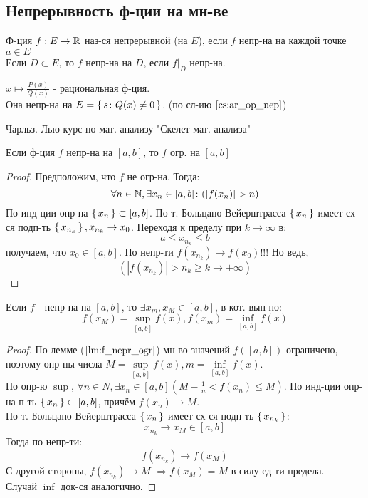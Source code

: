 \subsection{Непрерывность ф-ции на мн-ве}
\begin{definition}
Ф-ция $f: E \rightarrow \mathbb{R}$ наз-ся непрерывной (на $E$), если $f$ непр-на на каждой точке $a \in E$ \\

Если $D \subset E$, то $f$ непр-на на $D$, если $f|_{D}$ непр-на.
\end{definition}
\begin{example}
  $x \mapsto \frac{P(x)}{Q(x)}$ - рациональная ф-ция. \\
  Она непр-на на $E = \set{s \colon Q(x) \neq 0}$. (по сл-ию $\ref{cs:ar_op_nep}$)
\end{example}
\begin{note}
Чарльз. Лью курс по мат. анализу "Скелет мат. анализа"
\end{note}
\begin{lemma}
  \label {lm:f_nepr_ogr}
Если ф-ция $f$ непр-на на $[a, b]$, то $f$ огр. на $[a, b]$
\end{lemma}
\begin{proof}
Предположим, что $f$ не огр-на. Тогда:
\[
  \forall n \in \mathbb{N}, \exists x_n \in [a, b] \colon (\left|f(x_n)\right| > n)
\]
По инд-ции опр-на $\set{x_n} \subset [a, b]$. По т. Больцано-Вейерштрасса $\set{x_n}$ имеет сх-ся подп-ть $\set{x_{n_k}}, x_{n_k} \rightarrow x_0$. Переходя к пределу при $k \rightarrow \infty$ в:
\[
a \leq x_{n_k} \leq b
\]
получаем, что $x_0 \in [a, b]$. По непр-ти $f(x_{n_k}) \rightarrow f(x_0)$!!! Но ведь,
\[
  (\left|f(x_{n_k})\right| > n_k \geq k \rightarrow +\infty)
\]
\end{proof}
\begin{theorem}
  \label{th:num6}
  Если $f$ - непр-на на $[a, b]$, то $\exists x_m, x_M \in [a, b]$, в кот. вып-но:
  \[
  f(x_M) = \underset{[a, b]}{\sup} f(x), f(x_m) = \underset{[a, b]}{\inf} f(x)
  \]
\end{theorem}
\begin{proof}
По лемме ($\ref{lm:f_nepr_ogr}$) мн-во значений $f([a, b])$ ограничено, поэтому опр-ны числа $M = \underset{[a, b]}{\sup} f(x), m = \underset{[a, b]}{\inf} f(x)$. \\
По опр-ю $\sup$, $\forall n \in N, \exists x_n \in [a, b] (M - \frac{1}{n} < f(x_n) \leq M)$. По инд-ции опр-на п-ть $\set{x_n} \subset [a, b]$, причём $f(x_n) \rightarrow M$. \\
По т. Больцано-Вейерштрасса $\set{x_n}$ имеет сх-ся подп-ть $\set{x_{n_k}}$:
\[
  x_{n_k} \rightarrow x_M \in [a, b]
\]
Тогда по непр-ти:
\[
f(x_{n_k}) \rightarrow f(x_M)
\]
С другой стороны, $f(x_{n_k}) \rightarrow M$ $\Rightarrow f(x_M) = M$ в силу ед-ти предела. \\
Случай $\inf$ док-ся аналогично.
\end{proof}
